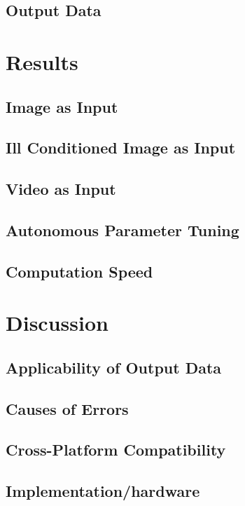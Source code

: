 \documentclass[a4paper,10pt]{article}
\begin{document}
  \subsection{Output Data}
  
\section{Results}
  \subsection{Image as Input}

  \subsection{Ill Conditioned Image as Input}

  \subsection{Video as Input}

  \subsection{Autonomous Parameter Tuning}
  \subsection{Computation Speed}
  
\section{Discussion}
  \subsection{Applicability of Output Data}

  \subsection{Causes of Errors}

  \subsection{Cross-Platform Compatibility}

  \subsection{Implementation/hardware}
\end{document}

